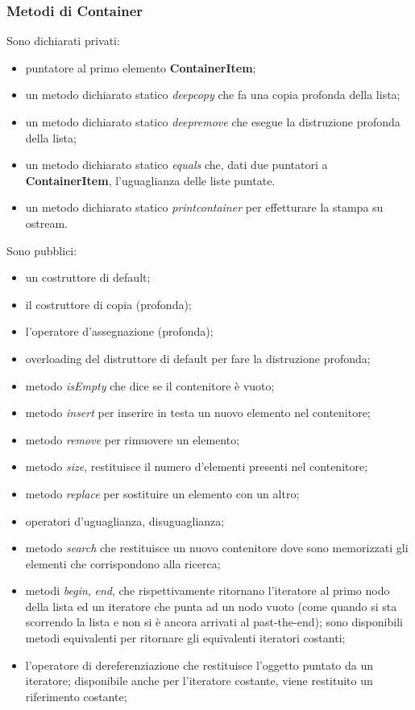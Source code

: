 {{			\subsubsection*{Metodi di Container}{
		Sono dichiarati privati:
			\begin{itemize}\itemsep=0.3pt
				\item puntatore al primo elemento \textbf{ContainerItem};
				\item un metodo dichiarato statico \textit{deepcopy} che fa una copia profonda della lista;
				\item un metodo dichiarato statico \textit{deepremove} che esegue la distruzione profonda della lista;
				\item un metodo dichiarato statico \textit{equals} che, dati due puntatori a \textbf{ContainerItem}, l'uguaglianza delle liste puntate.
				\item un metodo dichiarato statico \textit{printcontainer} per effetturare la stampa su ostream.
			\end{itemize}
			Sono pubblici:
			\begin{itemize}\itemsep=0.3pt
				\item un costruttore di default;
				\item il costruttore di copia (profonda);
				\item l'operatore d'assegnazione (profonda);
				\item overloading del distruttore di default per fare la distruzione profonda;
				\item metodo \textit{isEmpty} che dice se il contenitore è vuoto;
				\item metodo \textit{insert} per inserire in testa un nuovo elemento nel contenitore;
				\item metodo \textit{remove} per rimuovere un elemento;
				\item metodo \textit{size}, restituisce il numero d'elementi presenti nel contenitore;
				\item metodo \textit{replace} per sostituire un elemento con un altro;
				\item operatori d'uguaglianza, disuguaglianza;
				\item metodo \textit{search} che restituisce un nuovo contenitore dove sono memorizzati gli elementi che corrispondono alla ricerca;
				\item metodi \textit{begin}, \textit{end}, che rispettivamente ritornano l'iteratore al primo nodo della lista ed un iteratore che punta ad un nodo vuoto (come quando si sta scorrendo la lista e non si è ancora arrivati al past-the-end); sono disponibili metodi equivalenti per ritornare gli equivalenti iteratori costanti;
				\item l'operatore di dereferenziazione che restituisce l'oggetto puntato da un iteratore; disponibile anche per l'iteratore costante, viene restituito un riferimento costante;
			\end{itemize}
			}
		}
}
